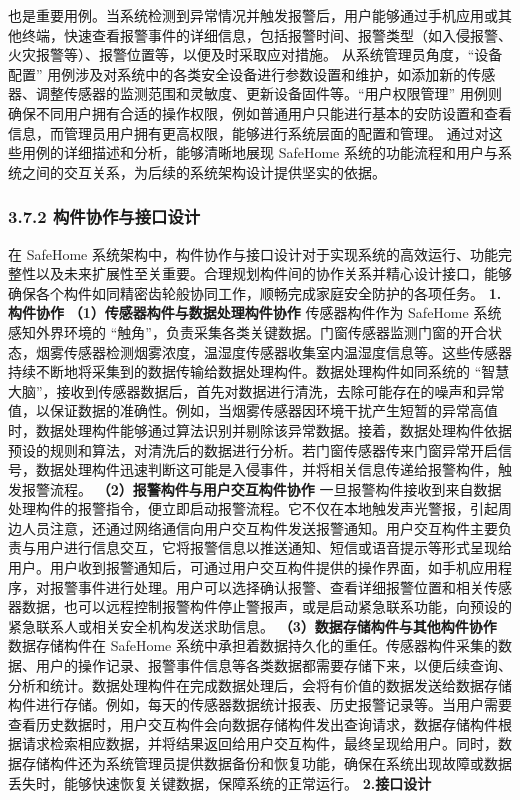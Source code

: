 也是重要用例。当系统检测到异常情况并触发报警后，用户能够通过手机应用或其他终端，快速查看报警事件的详细信息，包括报警时间、报警类型（如入侵报警、火灾报警等）、报警位置等，以便及时采取应对措施。 从系统管理员角度，``设备配置'' 用例涉及对系统中的各类安全设备进行参数设置和维护，如添加新的传感器、调整传感器的监测范围和灵敏度、更新设备固件等。``用户权限管理'' 用例则确保不同用户拥有合适的操作权限，例如普通用户只能进行基本的安防设置和查看信息，而管理员用户拥有更高权限，能够进行系统层面的配置和管理。 通过对这些用例的详细描述和分析，能够清晰地展现 SafeHome 系统的功能流程和用户与系统之间的交互关系，为后续的系统架构设计提供坚实的依据。 \subsubsection{3.7.2 构件协作与接口设计}\label{ux6784ux4ef6ux534fux4f5cux4e0eux63a5ux53e3ux8bbeux8ba1} 在 SafeHome 系统架构中，构件协作与接口设计对于实现系统的高效运行、功能完整性以及未来扩展性至关重要。合理规划构件间的协作关系并精心设计接口，能够确保各个构件如同精密齿轮般协同工作，顺畅完成家庭安全防护的各项任务。 \textbf{1.构件协作} \textbf{（1）传感器构件与数据处理构件协作} 传感器构件作为 SafeHome 系统感知外界环境的 ``触角''，负责采集各类关键数据。门窗传感器监测门窗的开合状态，烟雾传感器检测烟雾浓度，温湿度传感器收集室内温湿度信息等。这些传感器持续不断地将采集到的数据传输给数据处理构件。数据处理构件如同系统的 ``智慧大脑''，接收到传感器数据后，首先对数据进行清洗，去除可能存在的噪声和异常值，以保证数据的准确性。例如，当烟雾传感器因环境干扰产生短暂的异常高值时，数据处理构件能够通过算法识别并剔除该异常数据。接着，数据处理构件依据预设的规则和算法，对清洗后的数据进行分析。若门窗传感器传来门窗异常开启信号，数据处理构件迅速判断这可能是入侵事件，并将相关信息传递给报警构件，触发报警流程。 \textbf{（2）报警构件与用户交互构件协作} 一旦报警构件接收到来自数据处理构件的报警指令，便立即启动报警流程。它不仅在本地触发声光警报，引起周边人员注意，还通过网络通信向用户交互构件发送报警通知。用户交互构件主要负责与用户进行信息交互，它将报警信息以推送通知、短信或语音提示等形式呈现给用户。用户收到报警通知后，可通过用户交互构件提供的操作界面，如手机应用程序，对报警事件进行处理。用户可以选择确认报警、查看详细报警位置和相关传感器数据，也可以远程控制报警构件停止警报声，或是启动紧急联系功能，向预设的紧急联系人或相关安全机构发送求助信息。 \textbf{（3）数据存储构件与其他构件协作} 数据存储构件在 SafeHome 系统中承担着数据持久化的重任。传感器构件采集的数据、用户的操作记录、报警事件信息等各类数据都需要存储下来，以便后续查询、分析和统计。数据处理构件在完成数据处理后，会将有价值的数据发送给数据存储构件进行存储。例如，每天的传感器数据统计报表、历史报警记录等。当用户需要查看历史数据时，用户交互构件会向数据存储构件发出查询请求，数据存储构件根据请求检索相应数据，并将结果返回给用户交互构件，最终呈现给用户。同时，数据存储构件还为系统管理员提供数据备份和恢复功能，确保在系统出现故障或数据丢失时，能够快速恢复关键数据，保障系统的正常运行。 \textbf{2.接口设计} 